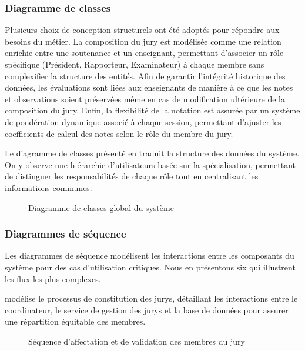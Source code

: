 \subsubsection{Diagramme de classes}
\label{ch3:classes}

Plusieurs choix de conception structurels ont été adoptés pour répondre aux besoins du métier. La composition du jury est modélisée comme une relation enrichie entre une soutenance et un enseignant, permettant d'associer un rôle spécifique (Président, Rapporteur, Examinateur) à chaque membre sans complexifier la structure des entités. Afin de garantir l'intégrité historique des données, les évaluations sont liées aux enseignants de manière à ce que les notes et observations soient préservées même en cas de modification ultérieure de la composition du jury. Enfin, la flexibilité de la notation est assurée par un système de pondération dynamique associé à chaque session, permettant d'ajuster les coefficients de calcul des notes selon le rôle du membre du jury.

Le diagramme de classes présenté en  traduit la structure des données du système. On y observe une hiérarchie d'utilisateurs basée sur la spécialisation, permettant de distinguer les responsabilités de chaque rôle tout en centralisant les informations communes.

\begin{figure}[H]
    \centering
    \caption{Diagramme de classes global du système}
    \label{fig:class_global}
\end{figure}

\subsubsection{Diagrammes de séquence}
\label{ch3:sequence}

Les diagrammes de séquence modélisent les interactions entre les composants du système pour des cas d'utilisation critiques. Nous en présentons six qui illustrent les flux les plus complexes.

 modélise le processus de constitution des jurys, détaillant les interactions entre le coordinateur, le service de gestion des jurys et la base de données pour assurer une répartition équitable des membres.
\begin{figure}[H]
    \centering
    \caption{Séquence d'affectation et de validation des membres du jury}
    \label{fig:seq_jury_assignment}
\end{figure}

